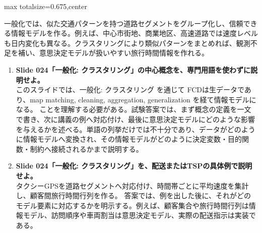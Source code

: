 \begin{adjustbox}{max totalsize={\textwidth}{0.675\textheight},center}
\begin{minipage}{\textwidth}
\begin{minipage}[t]{0.485\textwidth}
一般化では、似た交通パターンを持つ道路セグメントをグループ化し、信頼できる情報モデルを作る。例えば、中心市街地、商業地区、高速道路では速度レベルも日内変化も異なる。クラスタリングにより類似パターンをまとめれば、観測不足を補い、意思決定モデルが扱いやすい旅行時間情報を作れる。\par
{}
\begin{enumerate}
\item \textbf{Slide 024「一般化: クラスタリング」の中心概念を、専門用語を使わずに説明せよ。}\\このスライドでは、一般化: クラスタリング を通じて FCDは生データであり、map matching, cleaning, aggregation, generalization を経て情報モデルになる。 ことを理解する必要がある。試験答案では、まず概念の定義を一文で書き、次に講義の例へ対応付け、最後に意思決定モデルにどのような影響を与えるかを述べる。単語の列挙だけでは不十分であり、データがどのように情報モデルへ変換され、その情報モデルがどのように決定変数・目的関数・制約へ接続されるかまで説明する。
\item \textbf{Slide 024「一般化: クラスタリング」を、配送またはTSPの具体例で説明せよ。}\\タクシーGPSを道路セグメントへ対応付け、時間帯ごとに平均速度を集計し、顧客間旅行時間行列を作る。 答案では、例を出した後に、それがどのモデル要素に対応するかを明示する。例えば、顧客集合や旅行時間行列は情報モデル、訪問順序や車両割当は意思決定モデル、実際の配送指示は実装である。
\end{enumerate}
\end{minipage}
\end{minipage}
\end{adjustbox}

